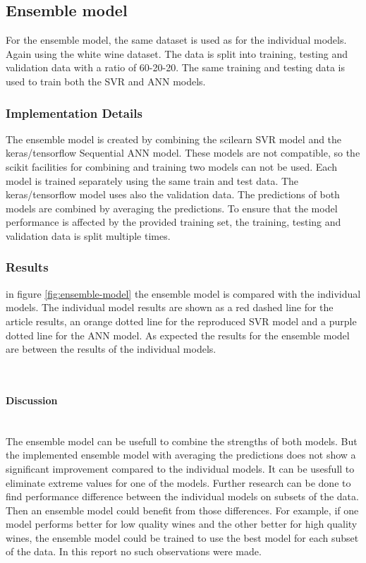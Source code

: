 \documentclass{article}
\newcommand{\subsubsubsection}[1]{%
  \paragraph{#1}\mbox{}\\}
\begin{document}
\subsection{Ensemble model}

For the ensemble model, the same dataset is used as for the individual models. Again using the white wine dataset.
The data is split into training, testing and validation data with a ratio of 60-20-20.
The same training and testing data is used to train both the SVR and ANN models.

\subsubsection{Implementation Details}
The ensemble model is created by combining the scilearn SVR model and the keras/tensorflow Sequential ANN model.
These models are not compatible, so the scikit facilities for combining and training two models can not be used.
Each model is trained separately using the same train and test data. The keras/tensorflow model uses also the validation data.
The predictions of both models are combined by averaging the predictions.
To ensure that the model performance is affected by the provided training set, the training, testing and validation data is split multiple times.

\subsubsection{Results}
in figure \autoref{fig:ensemble-model} the ensemble model is compared with the individual models.
The individual model results are shown as a red dashed line for the article results,
an orange dotted line for the reproduced SVR model and a purple dotted line for the ANN model.
As expected the results for the ensemble model are between the results of the individual models.

\subsubsubsection{Discussion}
The ensemble model can be usefull to combine the strengths of both models.
But the implemented ensemble model with averaging the predictions does not show a significant improvement compared to the individual models.
It can be usesfull to eliminate extreme values for one of the models.
Further research can be done to find performance difference between the individual models on subsets of the data.
Then an ensemble model could benefit from those differences.
For example, if one model performs better for low quality wines and the other better for high quality wines, the ensemble model could be trained to use the best model for each subset of the data.
In this report no such observations were made.
\end{document}
